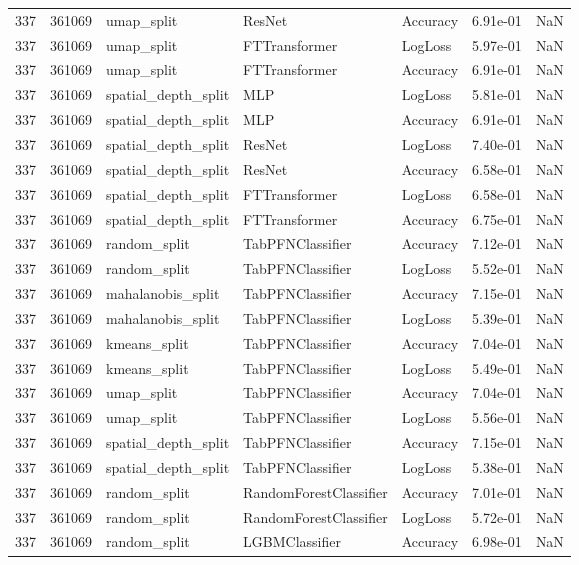 \begin{tabular}{rrlllrr}
337 & 361069 & umap\_split & ResNet & Accuracy & 6.91e-01 & NaN \\
337 & 361069 & umap\_split & FTTransformer & LogLoss & 5.97e-01 & NaN \\
337 & 361069 & umap\_split & FTTransformer & Accuracy & 6.91e-01 & NaN \\
337 & 361069 & spatial\_depth\_split & MLP & LogLoss & 5.81e-01 & NaN \\
337 & 361069 & spatial\_depth\_split & MLP & Accuracy & 6.91e-01 & NaN \\
337 & 361069 & spatial\_depth\_split & ResNet & LogLoss & 7.40e-01 & NaN \\
337 & 361069 & spatial\_depth\_split & ResNet & Accuracy & 6.58e-01 & NaN \\
337 & 361069 & spatial\_depth\_split & FTTransformer & LogLoss & 6.58e-01 & NaN \\
337 & 361069 & spatial\_depth\_split & FTTransformer & Accuracy & 6.75e-01 & NaN \\
337 & 361069 & random\_split & TabPFNClassifier & Accuracy & 7.12e-01 & NaN \\
337 & 361069 & random\_split & TabPFNClassifier & LogLoss & 5.52e-01 & NaN \\
337 & 361069 & mahalanobis\_split & TabPFNClassifier & Accuracy & 7.15e-01 & NaN \\
337 & 361069 & mahalanobis\_split & TabPFNClassifier & LogLoss & 5.39e-01 & NaN \\
337 & 361069 & kmeans\_split & TabPFNClassifier & Accuracy & 7.04e-01 & NaN \\
337 & 361069 & kmeans\_split & TabPFNClassifier & LogLoss & 5.49e-01 & NaN \\
337 & 361069 & umap\_split & TabPFNClassifier & Accuracy & 7.04e-01 & NaN \\
337 & 361069 & umap\_split & TabPFNClassifier & LogLoss & 5.56e-01 & NaN \\
337 & 361069 & spatial\_depth\_split & TabPFNClassifier & Accuracy & 7.15e-01 & NaN \\
337 & 361069 & spatial\_depth\_split & TabPFNClassifier & LogLoss & 5.38e-01 & NaN \\
337 & 361069 & random\_split & RandomForestClassifier & Accuracy & 7.01e-01 & NaN \\
337 & 361069 & random\_split & RandomForestClassifier & LogLoss & 5.72e-01 & NaN \\
337 & 361069 & random\_split & LGBMClassifier & Accuracy & 6.98e-01 & NaN \\

\end{tabular}
